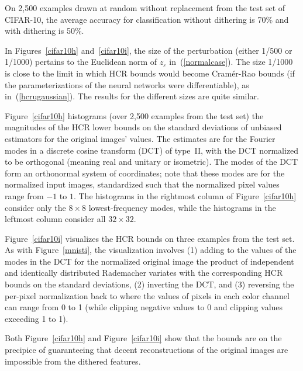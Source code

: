 \documentclass[]{fairmeta}
\renewcommand{\epsilon}{\varepsilon}
\begin{document}
On 2,500 examples drawn at random without replacement
from the test set of CIFAR-10, the average accuracy for classification
without dithering is 70\% and with dithering is 50\%.

In Figures~\ref{cifar10h} and~\ref{cifar10i}, the size of the perturbation
(either 1/500 or 1/1000) pertains to the Euclidean norm of $z_{\epsilon}$
in~(\ref{normalcase}). The size 1/1000 is close to the limit
in which HCR bounds would become Cram\'er-Rao bounds (if the parameterizations
of the neural networks were differentiable), as in~(\ref{hcrugaussian}).
The results for the different sizes are quite similar.

Figure~\ref{cifar10h} histograms (over 2,500 examples from the test set)
the magnitudes of the HCR lower bounds on the standard deviations
of unbiased estimators for the original images' values.
The estimates are for the Fourier modes in a discrete cosine transform (DCT)
of type~II, with the DCT normalized to be orthogonal (meaning real and unitary
or isometric).
The modes of the DCT form an orthonormal system of coordinates;
note that these modes are for the normalized input images,
standardized such that the normalized pixel values range from $-1$ to $1$.
The histograms in the rightmost column of Figure~\ref{cifar10h}
consider only the $8 \times 8$ lowest-frequency modes,
while the histograms in the leftmost column consider all $32 \times 32$.

Figure~\ref{cifar10i} visualizes the HCR bounds on three examples
from the test set. As with Figure~\ref{mnisti}, the visualization involves
(1) adding to the values of the modes in the DCT
for the normalized original image the product
of independent and identically distributed Rademacher variates
with the corresponding HCR bounds on the standard deviations,
(2) inverting the DCT, and
(3) reversing the per-pixel normalization back to where the values of pixels
in each color channel can range from 0 to 1 (while clipping negative values
to 0 and clipping values exceeding 1 to 1).

Both Figure~\ref{cifar10h} and Figure~\ref{cifar10i} show that the bounds
are on the precipice of guaranteeing that decent reconstructions
of the original images are impossible from the dithered features.
\end{document}
